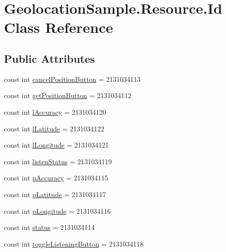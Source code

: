 \hypertarget{class_geolocation_sample_1_1_resource_1_1_id}{\section{Geolocation\+Sample.\+Resource.\+Id Class Reference}
\label{class_geolocation_sample_1_1_resource_1_1_id}
}
\subsection*{Public Attributes}
\begin{DoxyCompactItemize}
\item 
const int \hyperlink{class_geolocation_sample_1_1_resource_1_1_id_a09dfbb15e68dfd681259766207463b58}{cancel\+Position\+Button} = 2131034113
\item 
const int \hyperlink{class_geolocation_sample_1_1_resource_1_1_id_aa0255ae2e02fa8824a0922184cb177b8}{get\+Position\+Button} = 2131034112
\item 
const int \hyperlink{class_geolocation_sample_1_1_resource_1_1_id_a155911b232e6a77ccff5fcd231d6045f}{l\+Accuracy} = 2131034120
\item 
const int \hyperlink{class_geolocation_sample_1_1_resource_1_1_id_acfc1712bda04f8ff90da627f9fb222f4}{l\+Latitude} = 2131034122
\item 
const int \hyperlink{class_geolocation_sample_1_1_resource_1_1_id_ad449cd59afcc159d26b057975539f328}{l\+Longitude} = 2131034121
\item 
const int \hyperlink{class_geolocation_sample_1_1_resource_1_1_id_a3213a0062b76ca46cefe01eb33a8af38}{listen\+Status} = 2131034119
\item 
const int \hyperlink{class_geolocation_sample_1_1_resource_1_1_id_a1aca12cfc3ed1f8db138bf005f7198e8}{p\+Accuracy} = 2131034115
\item 
const int \hyperlink{class_geolocation_sample_1_1_resource_1_1_id_a66b68d4271f6b2761fbf7b261a0b8f4c}{p\+Latitude} = 2131034117
\item 
const int \hyperlink{class_geolocation_sample_1_1_resource_1_1_id_af3b73175fd4d7cf7a4a1681315e6f3af}{p\+Longitude} = 2131034116
\item 
const int \hyperlink{class_geolocation_sample_1_1_resource_1_1_id_a31f9e06f3aaa9196c4cea90e06201c7c}{status} = 2131034114
\item 
const int \hyperlink{class_geolocation_sample_1_1_resource_1_1_id_a768d752d2e063a7351c37f7c8231e382}{toggle\+Listening\+Button} = 2131034118
\end{DoxyCompactItemize}


